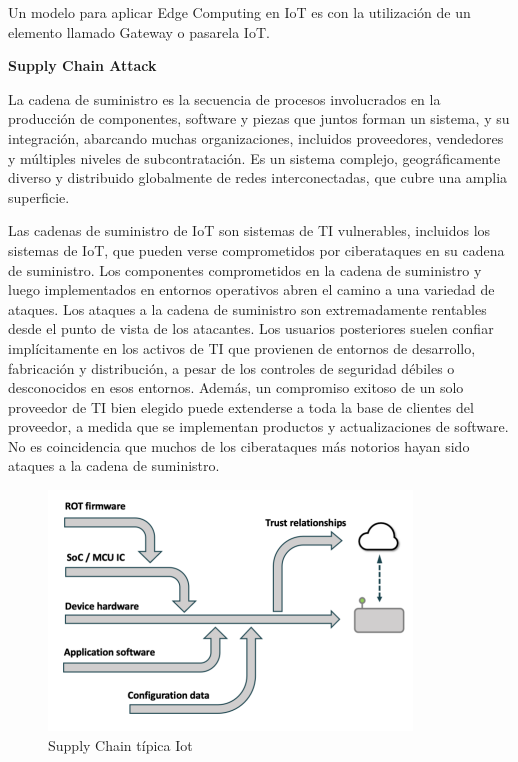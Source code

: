 Un modelo para aplicar Edge Computing en IoT es con la utilización de un elemento llamado Gateway o pasarela IoT.\cite{rfc7452}


\textbf{Supply Chain Attack}

La cadena de suministro es la secuencia de procesos involucrados en la producción de componentes, software y piezas que juntos forman un sistema, y su integración, abarcando muchas organizaciones, incluidos proveedores, vendedores y múltiples niveles de subcontratación. Es un sistema complejo, geográficamente diverso y distribuido globalmente de redes interconectadas, que cubre una amplia superficie.\cite{omitola2018}

Las cadenas de suministro de IoT son sistemas de TI vulnerables, incluidos los sistemas de IoT, que pueden verse comprometidos por ciberataques en su cadena de suministro. Los componentes comprometidos en la cadena de suministro y luego implementados en entornos operativos abren el camino a una variedad de ataques. Los ataques a la cadena de suministro son extremadamente rentables desde el punto de vista de los atacantes. Los usuarios posteriores suelen confiar implícitamente en los activos de TI que provienen de entornos de desarrollo, fabricación y distribución, a pesar de los controles de seguridad débiles o desconocidos en esos entornos. Además, un compromiso exitoso de un solo proveedor de TI bien elegido puede extenderse a toda la base de clientes del proveedor, a medida que se implementan productos y actualizaciones de software. No es coincidencia que muchos de los ciberataques más notorios hayan sido ataques a la cadena de suministro.

\begin{figure}[ht]
    \centering
    \includegraphics[width=0.5\linewidth]{Imágenes/Ramas principales de una red de suministro de dispositivos IoT típica.png}
    \caption{Supply Chain típica Iot}
    \label{fig:Supply_chain_tipoca_IoT}
\end{figure}

